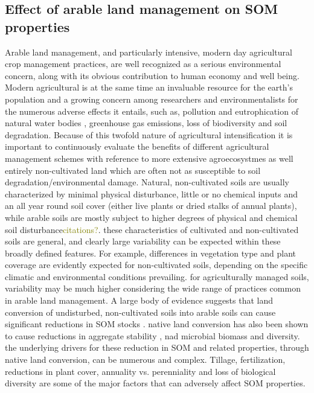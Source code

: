 \documentclass[12pt]{report}
\newcommand{\myGreen}[1]{\textcolor{olive}{#1}} %
\begin{document}
	\subsection{Effect of arable land management on SOM properties}
		
		Arable land management, and particularly intensive, modern day agricultural crop management practices, are well recognized as a serious environmental concern, along with its obvious contribution to human economy and well being. 
		Modern agricultural is at the same time an invaluable resource for the earth’s population and a growing concern among researchers and environmentalists for the numerous adverse effects it entails, such as, pollution and eutrophication of natural water bodies \citep{liu2012,rabalais2002}, greenhouse gas emissions\citep{vermeulen2012}, loss of biodiversity\citep{laurance2014} and soil degradation\citep{grunwald2011}.          
		Because of this twofold nature of agricultural intensification it is important to continuously evaluate the benefits of different agricultural management schemes with reference to more extensive agroecosystmes as well entirely non-cultivated land which are often not as susceptible to soil degradation/environmental damage. 
		Natural, non-cultivated soils are usually characterized by minimal physical disturbance, little or no chemical inputs and an all year round soil cover (either live plants or dried stalks of annual plants), while arable soils are mostly subject to higher degrees of physical and chemical soil disturbance\myGreen{citations?}. 
		these characteristics of cultivated and non-cultivated soils are general, and clearly large variability can be expected within these broadly defined features. For example, differences in vegetation type and plant coverage are evidently expected for non-cultivated soils, depending on the specific climatic and environmental conditions prevailing. for agriculturally managed soils, variability may be much higher considering the wide range of practices common in arable land management.      
		A large body of evidence suggests that land conversion of undisturbed, non-cultivated soils into arable soils can cause significant reductions in SOM stocks \citep{ashagrie2007, spaccini2001, ogle2005}.
		native land conversion has also been shown to cause reductions in aggregate stability \citep{bongiovanni2006, cambardella1993,  elliott1986}, nad microbial biomass \citep{mganga2016, soleimani2019 } and diversity\citep{monkai2018}.
		the underlying drivers for these reduction in SOM and related properties, through native land conversion, can be numerous and complex. Tillage, fertilization, reductions in plant cover, annuality vs. perenniality and loss of biological diversity are some of the major factors that can adversely affect SOM properties.
\end{document}

